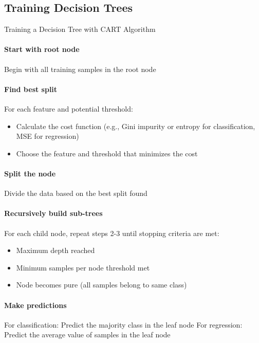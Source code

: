 \subsection{Training Decision Trees}

\begin{KR}{Training a Decision Tree with CART Algorithm}\\
\paragraph{Start with root node}
Begin with all training samples in the root node

\paragraph{Find best split}
For each feature and potential threshold:
\begin{itemize}
    \item Calculate the cost function (e.g., Gini impurity or entropy for classification, MSE for regression)
    \item Choose the feature and threshold that minimizes the cost
\end{itemize}

\paragraph{Split the node}
Divide the data based on the best split found

\paragraph{Recursively build sub-trees}
For each child node, repeat steps 2-3 until stopping criteria are met:
\begin{itemize}
    \item Maximum depth reached
    \item Minimum samples per node threshold met
    \item Node becomes pure (all samples belong to same class)
\end{itemize}

\paragraph{Make predictions}
For classification: Predict the majority class in the leaf node
For regression: Predict the average value of samples in the leaf node
\end{KR}

